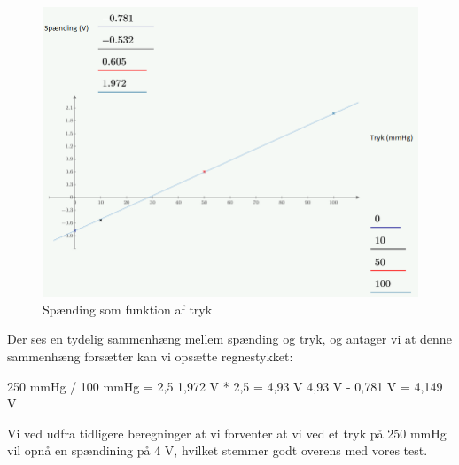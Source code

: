 \begin{figure}[h!]
	\centering
	\includegraphics[width=1\linewidth]{Hardware/GrafTrykOgSpaending}
	\caption{Spænding som funktion af tryk}
	\label{fig:GrafTrykOgSpaending}
\end{figure}

Der ses en tydelig sammenhæng mellem spænding og tryk, og antager vi at denne sammenhæng forsætter kan vi opsætte regnestykket:

250 mmHg  / 100 mmHg = 2,5
1,972 V * 2,5 = 4,93 V
4,93 V - 0,781 V = 4,149 V

Vi ved udfra tidligere beregninger at vi forventer at vi ved et tryk på 250 mmHg vil opnå en spændining på 4 V, hvilket stemmer godt overens med vores test.

\clearpage

